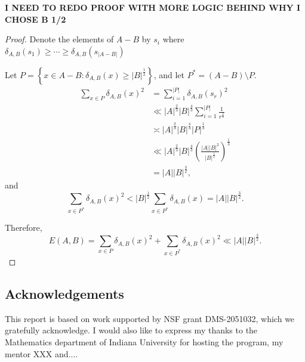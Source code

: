 \documentclass[12pt]{amsart}
\begin{document}
\textbf{I NEED TO REDO PROOF WITH MORE LOGIC BEHIND WHY I CHOSE B 1/2}
\begin{proof}
Denote the elements of \(A-B\) by \(s_{i} \) where \(\delta_{A,B} (s_1) \geq \cdots \geq \delta_{A,B} (s _{\left\lvert A-B \right\rvert } )\)

Let \(P = \left\{ x \in A - B : \delta_{A,B} (x) \geq \left\lvert B \right\rvert ^{\frac{1}{2} } \right\} \), and let \(P ^{*} = \left( A - B \right) \setminus P\).
\begin{align*}
    \sum _{x \in P} \delta_{A,B} (x)^{2} & =  \sum_{i=1}^{\left\lvert P \right\rvert } \delta_{A,B} (s _{r} )^{2}\\
    & \ll \left\lvert A \right\rvert ^{\frac{2}{3} } \left\lvert B \right\rvert ^{\frac{4}{3} } \sum_{i=1}^{\left\lvert P \right\rvert } \frac{1}{r^{\frac{2}{3} }} \\
    & \asymp \left\lvert A \right\rvert ^{\frac{2}{3} } \left\lvert B \right\rvert ^{\frac{4}{3} } \left\lvert P \right\rvert ^{\frac{1}{3} }\\
    & \ll \left\lvert A \right\rvert ^{\frac{2}{3} } \left\lvert B \right\rvert ^{\frac{4}{3} } \left( \frac{\left\lvert A \right\rvert \left\lvert B \right\rvert ^{2}}{\left\lvert B \right\rvert ^{\frac{1}{2} }}  \right) ^{\frac{1}{3} }\\
    & = \left\lvert A \right\rvert \left\lvert B \right\rvert ^{\frac{3}{2} },
\end{align*}
and
\[
    \sum _{x \in P^{*}} \delta_{A,B} (x)^{2} < \left\lvert B \right\rvert ^{\frac{1}{2} } \sum _{x \in P^{*}} \delta_{A,B} (x) = \left\lvert A \right\rvert \left\lvert B \right\rvert ^{\frac{3}{2} }
.\]

Therefore,
\[
    E(A,B) = \sum _{x \in P} \delta_{A,B} (x)^{2} + \sum _{x \in P ^{*}} \delta_{A,B} (x)^{2} \ll \left\lvert A \right\rvert \left\lvert B \right\rvert ^{\frac{3}{2} } 
.\]

\end{proof}

\subsection*{Acknowledgements} %
This report is based on work supported by NSF grant DMS-2051032, which we gratefully acknowledge. I would also like to express my thanks to the Mathematics department of Indiana University for hosting the program, my mentor XXX and....
\end{document}

